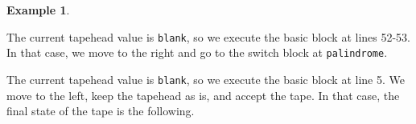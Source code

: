 \documentclass{article}
\theoremstyle{definition}
\newtheorem{example}[rules]{Example}
\begin{document}
\begin{example}
\begin{figure}[H]
    \end{figure}
    \noindent The current tapehead value is \texttt{blank}, so we execute the basic block at lines 52-53. In that case, we move to the right and go to the switch block at \texttt{palindrome}.
    \begin{figure}[H]
        \centering
    \end{figure}
    \noindent The current tapehead value is \texttt{blank}, so we execute the basic block at line 5. We move to the left, keep the tapehead as is, and accept the tape. In that case, the final state of the tape is the following.
    \begin{figure}[H]
        \centering
    \end{figure}
\end{example}
\end{document}
